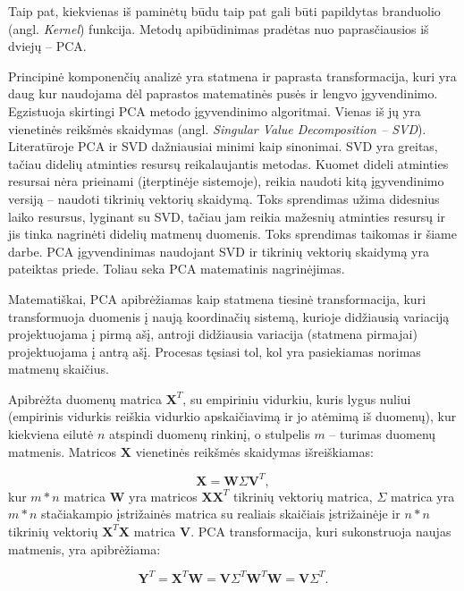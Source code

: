 \documentclass[]{vgtuef}
\begin{document}
Taip pat, kiekvienas iš paminėtų būdu taip pat gali būti papildytas branduolio (angl. \textit{Kernel}) funkcija. Metodų apibūdinimas pradėtas nuo paprasčiausios iš dviejų -- PCA.

Principinė komponenčių analizė \cite{citeulike:2695782} yra statmena ir paprasta transformacija, kuri yra daug kur naudojama dėl paprastos matematinės pusės ir lengvo įgyvendinimo. Egzistuoja skirtingi PCA metodo įgyvendinimo algoritmai. Vienas iš jų yra vienetinės reikšmės skaidymas (angl. \textit{Singular Value Decomposition -- SVD}). Literatūroje PCA ir SVD dažniausiai minimi kaip sinonimai. SVD yra greitas, tačiau didelių atminties resursų reikalaujantis metodas. Kuomet dideli atminties resursai nėra prieinami (įterptinėje sistemoje), reikia naudoti kitą įgyvendinimo versiją -- naudoti tikrinių vektorių skaidymą. Toks sprendimas užima didesnius laiko resursus, lyginant su SVD, tačiau jam reikia mažesnių atminties resursų ir jis tinka nagrinėti didelių matmenų duomenis. Toks sprendimas taikomas ir šiame darbe. PCA įgyvendinimas naudojant SVD ir tikrinių vektorių skaidymą yra pateiktas priede. Toliau seka PCA matematinis nagrinėjimas.

Matematiškai, PCA apibrėžiamas kaip statmena tiesinė transformacija, kuri transformuoja duomenis į naują koordinačių sistemą, kurioje didžiausią variaciją projektuojama į pirmą ašį, antroji didžiausia variacija (statmena pirmajai) projektuojama į antrą ašį. Procesas tęsiasi tol, kol yra pasiekiamas norimas matmenų skaičius.

Apibrėžta duomenų matrica $\textbf{X}^T$, su empiriniu vidurkiu, kuris lygus nuliui (empirinis vidurkis reiškia vidurkio apskaičiavimą ir jo atėmimą iš duomenų), kur kiekviena eilutė $n$ atspindi duomenų rinkinį, o stulpelis $m$ -- turimas duomenų matmenis. Matricos $\textbf{X}$ vienetinės reikšmės skaidymas išreiškiamas:

\begin{equation}
  \mathbf{X} = \mathbf{W} \Sigma \mathbf{V}^T,
\end{equation}
kur $m*n$ matrica $\mathbf{W}$ yra matricos $\textbf{XX}^T$ tikrinių vektorių matrica, $\Sigma$ matrica yra $m*n$ stačiakampio įstrižainės matrica su realiais skaičiais įstrižainėje ir $n*n$ tikrinių vektorių $\mathbf{X}^T\mathbf{X}$ matrica $\mathbf{V}$. PCA transformacija, kuri sukonstruoja naujas matmenis, yra apibrėžiama:

\begin{equation}
  \mathbf{Y}^T = \mathbf{X}^T \mathbf{W} = \mathbf{V} \Sigma^T
  \mathbf{W}^T \mathbf{W} = \mathbf{V} \Sigma^T .
\end{equation}
\end{document}
